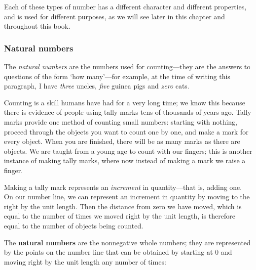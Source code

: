 Each of these types of number has a different character and different properties, and is used for different purposes, as we will see later in this chapter and throughout this book.

\subsubsection*{Natural numbers}

The \textit{natural numbers} are the numbers used for counting---they are the answers to questions of the form `how many'---for example, at the time of writing this paragraph, I have \textit{three} uncles, \textit{five} guinea pigs
and \textit{zero} cats.

Counting is a skill humans have had for a very long time; we know this because there is evidence of people using tally marks tens of thousands of years ago. Tally marks provide one method of counting small numbers: starting with nothing, proceed through the objects you want to count one by one, and make a mark for every object. When you are finished, there will be as many marks as there are objects. We are taught from a young age to count with our fingers; this is another instance of making tally marks, where now instead of making a mark we raise a finger.

Making a tally mark represents an \textit{increment} in quantity---that is, adding one. On our number line, we can represent an increment in quantity by moving to the right by the unit length. Then the distance from zero we have moved, which is equal to the number of times we moved right by the unit length, is therefore equal to the number of objects being counted.

\begin{definition}
\label{defNaturalNumberInformal}
The \textbf{natural numbers} are the nonnegative whole numbers; they are represented by the points on the number line that can be obtained by starting at $0$ and moving right by the unit length any number of times:
\begin{center}
\end{center}
~
\end{definition}

